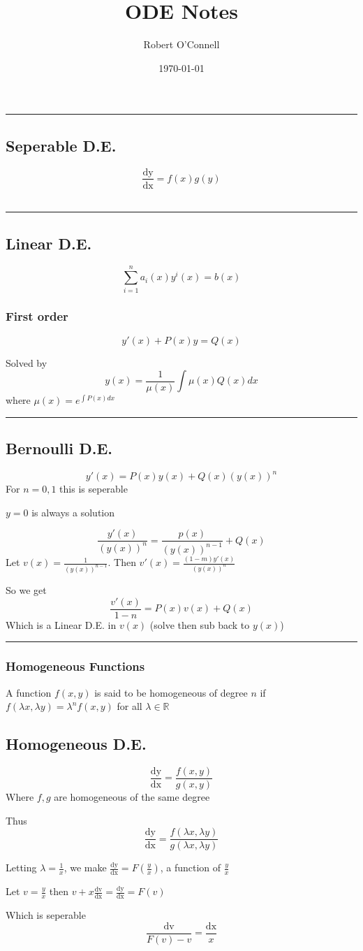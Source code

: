 \documentclass{article}
\title{\textbf{ODE Notes}}
\author{Robert O'Connell}
\date{\today}
\begin{document}
\maketitle

\hrule

\subsection*{Seperable D.E.}
\[
	\frac{\mathrm{dy}}{\mathrm{dx}} = f(x)g(y)
\]
\\

\hrule

\subsection*{Linear D.E.}
\[
	\sum_{i=1}^{n} a_i(x)y^i(x) = b(x)
\]
\subsubsection*{First order}
\[
	y'(x) + P(x)y = Q(x)
\]

Solved by
\[
	y(x) = \frac{1}{\mu(x)}\int \mu(x) Q(x) dx
\]
where \( \mu(x) = e^{\int P(x) dx} \)
\\

\hrule

\subsection*{Bernoulli D.E.}
\[
	y'(x) = P(x)y(x) + Q(x)(y(x))^n
\]
For \( n = 0,1 \) this is seperable

\( y=0 \) is always a solution

\[
	\frac{y'(x)}{(y(x))^n} = \frac{p(x)}{(y(x))^{n-1}} + Q(x)
\]
Let \( v(x) = \frac{1}{(y(x))^{n-1}} \). Then \( v'(x) = \frac{(1-m)y'(x)}{(y(x))^n} \)

So we get
\[
	\frac{v'(x)}{1-n} = P(x)v(x) + Q(x)
\]
Which is a Linear D.E. in \( v(x) \) (solve then sub back to \( y(x) \))
\\

\hrule
\subsubsection*{Homogeneous Functions}
A function \( f(x,y) \) is said to be homogeneous of degree \( n \) if \( f(\lambda x, \lambda y) = \lambda^n f(x,y) \) for all \( \lambda \in \mathbb{R} \)
\subsection*{Homogeneous D.E.}
\[
	\frac{\mathrm{dy}}{\mathrm{dx}} = \frac{f(x,y)}{g(x,y)}
\]
Where \( f,g \) are homogeneous of the same degree

Thus
\[
	\frac{\mathrm{dy}}{\mathrm{dx}} = \frac{f(\lambda x, \lambda y)}{g(\lambda x, \lambda y)}
\]

Letting \( \lambda = \frac{1}{x} \), we make \( \frac{\mathrm{dy}}{\mathrm{dx}}  = F(\frac{y}{x})\), a function of \( \frac{y}{x} \)

Let \( v = \frac{y}{x} \) then \( v + x \frac{\mathrm{dv}}{\mathrm{dx}} = \frac{\mathrm{dy}}{\mathrm{dx}}  = F(v) \)

Which is seperable
\[
	\frac{\mathrm{dv}}{F(v) -v} = \frac{\mathrm{dx}}{x}
\]
\end{document}
